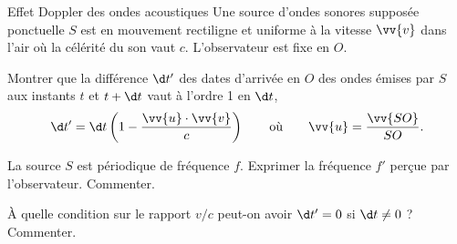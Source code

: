 \begin{exo}[PC]{Effet Doppler des ondes acoustiques}
Une source d'ondes sonores supposée ponctuelle $S$ est en mouvement rectiligne et uniforme à la vitesse $\vv{v}$ dans l'air où la célérité du son vaut $c$. L'observateur est fixe en $O$.
\begin{quest}
\item Montrer que la différence $\d t'$ des dates d'arrivée en $O$ des ondes émises par $S$ aux instants $t$ et $t+\d t$ vaut à l'ordre 1 en $\d t$, $$\d t'=\d t\left(1-\frac{\vv{u}\cdot\vv{v}}{c}\right)\qquad\text{où}\qquad \vv{u}=\frac{\vv{SO}}{SO}.$$
\item La source $S$ est périodique de fréquence $f$. Exprimer la fréquence $f'$ perçue par l'observateur. Commenter.
\item À quelle condition sur le rapport $v/c$ peut-on avoir $\d t'=0$ si $\d t\neq 0$ ? Commenter.
\end{quest}
\end{exo}


